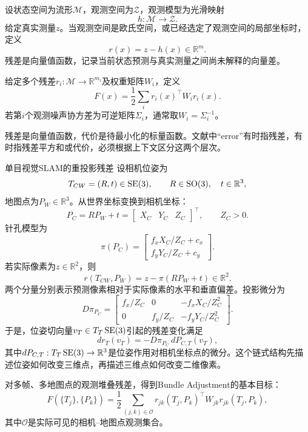 \begin{definition}[残差函数]
设状态空间为流形$\mathcal M$，观测空间为$\mathcal Z$，观测模型为光滑映射
\[
    h:\mathcal M\to\mathcal Z.
\]
给定真实测量$z$。当观测空间是欧氏空间，或已经选定了观测空间的局部坐标时，定义
\[
    r(x)=z-h(x)\in\mathbb R^m.
\]
残差是向量值函数，记录当前状态预测与真实测量之间尚未解释的向量差。
\end{definition}

\begin{definition}[加权最小二乘代价]
给定多个残差$r_i:\mathcal M\to\mathbb R^{m_i}$及权重矩阵$W_i$，定义
\[
    F(x)=\frac12\sum_i r_i(x)^\top W_i r_i(x).
\]
若第$i$个观测噪声协方差为可逆矩阵$\Sigma_i$，通常取$W_i=\Sigma_i^{-1}$。
\end{definition}

残差是向量值函数，代价是待最小化的标量函数。文献中“error”有时指残差，有时指残差平方和或代价，必须根据上下文区分这两个层次。

\begin{slamcase}{单目视觉SLAM的重投影残差}
设相机位姿为
\[
    T_{CW}=(R,t)\in\operatorname{SE}(3),
    \qquad R\in\operatorname{SO}(3),\quad t\in\mathbb R^3,
\]
地图点为$P_W\in\mathbb R^3$。从世界坐标变换到相机坐标：
\[
    P_C=RP_W+t
    =\begin{bmatrix}X_C&Y_C&Z_C\end{bmatrix}^{\top},
    \qquad Z_C>0.
\]
针孔模型为
\[
    \pi(P_C)=
    \begin{bmatrix}
        f_xX_C/Z_C+c_x\\
        f_yY_C/Z_C+c_y
    \end{bmatrix}.
\]
若实际像素为$z\in\mathbb R^2$，则
\[
    r(T_{CW},P_W)=z-\pi(RP_W+t)\in\mathbb R^2.
\]
两个分量分别表示预测像素相对于实际像素的水平和垂直偏差。投影微分为
\[
    D\pi_{P_C}=
    \begin{bmatrix}
        f_x/Z_C & 0 & -f_xX_C/Z_C^2\\
        0 & f_y/Z_C & -f_yY_C/Z_C^2
    \end{bmatrix}.
\]
于是，位姿切向量$v_T\in T_T\operatorname{SE}(3)$引起的残差变化满足
\[
    dr_T(v_T)=-D\pi_{P_C}\,dP_{C,T}(v_T),
\]
其中$dP_{C,T}:T_T\operatorname{SE}(3)\to\mathbb R^3$是位姿作用对相机坐标点的微分。这个链式结构先描述位姿如何改变三维点，再描述三维点如何改变二维像素。

对多帧、多地图点的观测堆叠残差，得到Bundle Adjustment的基本目标：
\[
    F(\{T_j\},\{P_k\})
    =\frac12\sum_{(j,k)\in\mathcal O}
    r_{jk}(T_j,P_k)^\top W_{jk}r_{jk}(T_j,P_k),
\]
其中$\mathcal O$是实际可见的相机--地图点观测集合。
\end{slamcase}

